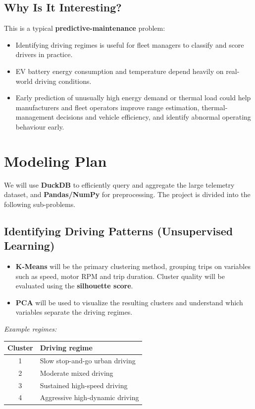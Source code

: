 \documentclass[11pt,letterpaper]{article}
\begin{document}
\subsection{Why Is It Interesting?}
This is a typical \textbf{predictive-maintenance} problem:
\begin{itemize}
  \item Identifying driving regimes is useful for fleet managers to classify and score drivers in practice.
  \item EV battery energy consumption and temperature depend heavily on real-world driving conditions.
  \item Early prediction of unusually high energy demand or thermal load could help manufacturers and fleet operators improve range estimation, thermal-management decisions and vehicle efficiency, and identify abnormal operating behaviour early.
\end{itemize}

\section{Modeling Plan}

We will use \textbf{DuckDB} to efficiently query and aggregate the large telemetry dataset, and \textbf{Pandas/NumPy} for preprocessing. The project is divided into the following sub-problems.

\subsection{Identifying Driving Patterns (Unsupervised Learning)}\label{sp:1}
\begin{itemize}
  \item \textbf{K-Means} will be the primary clustering method, grouping trips on variables such as speed, motor RPM and trip duration. Cluster quality will be evaluated using the \textbf{silhouette score}.
  \item \textbf{PCA} will be used to visualize the resulting clusters and understand which variables separate the driving regimes.
\end{itemize}

\textit{Example regimes:}
\begin{center}
\renewcommand{\arraystretch}{1.3}
\begin{tabular}{|c|l|}
  \hline
  \textbf{Cluster} & \textbf{Driving regime} \\
  \hline
  1 & Slow stop-and-go urban driving \\
  \hline
  2 & Moderate mixed driving \\
  \hline
  3 & Sustained high-speed driving \\
  \hline
  4 & Aggressive high-dynamic driving \\
  \hline
\end{tabular}
\end{center}
\end{document}
